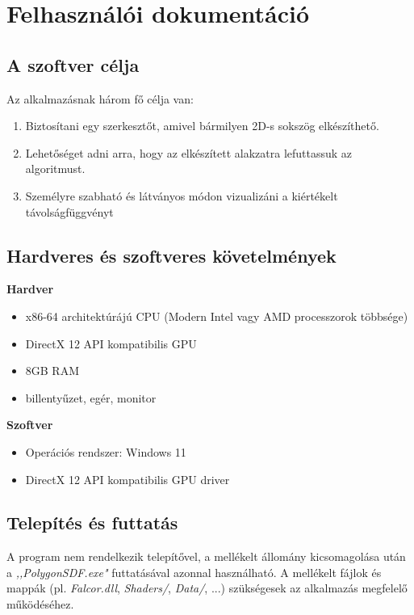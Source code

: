 \chapter{Felhasználói dokumentáció}
\label{ch:user}


\section{A szoftver célja}

Az alkalmazásnak három fő célja van:
\begin{enumerate}
    \item Biztosítani egy szerkesztőt, amivel bármilyen 2D-s sokszög elkészíthető.
    \item Lehetőséget adni arra, hogy az elkészített alakzatra lefuttassuk az algoritmust.
    \item Személyre szabható és látványos módon vizualizáni a kiértékelt távolságfüggvényt
\end{enumerate}


\section{Hardveres és szoftveres követelmények}

\textbf{Hardver}
\begin{itemize}
    \item x86-64 architektúrájú CPU (Modern Intel vagy AMD processzorok többsége)
    \item DirectX 12 API kompatibilis GPU
    \item 8GB RAM
    \item billentyűzet, egér, monitor
\end{itemize}

\textbf{Szoftver}
\begin{itemize}
    \item Operációs rendszer: Windows 11
    \item DirectX 12 API kompatibilis GPU driver
\end{itemize}


\section{Telepítés és futtatás}

A program nem rendelkezik telepítővel, a mellékelt állomány kicsomagolása után a \textit{,,PolygonSDF.exe"} futtatásával azonnal használható. A mellékelt fájlok és mappák (pl. \textit{Falcor.dll}, \textit{Shaders/}, \textit{Data/}, ...) szükségesek az alkalmazás megfelelő működéséhez.


